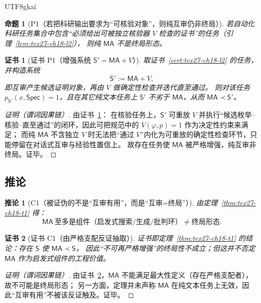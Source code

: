 \documentclass[12pt]{article}
\newtheorem{proposition}{命题}[section]
\newtheorem{corollary}{推论}[section]
\newtheorem{Certificate}{证书}[section]
\begin{document}
\begin{CJK*}{UTF8}{gkai}
\begin{proposition}[P1（若把科研输出要求为“可核验对象”，则纯互审仍非终局）]
\label{prop:tex27-ch18-p1}
若自动化科研任务集合中包含“必须给出可被独立核验器 $V$ 检查的证书”的任务（引理~\ref{lem:tex27-ch18-l2}），
则纯 $\mathsf{MA}$ 不是终局形态。
\end{proposition}

\begin{Certificate}[证书 P1（增强系统 $\mathsf{S}'=\mathsf{MA}+V$）]
\label{cert:tex27-ch18-p1}
取证书~\ref{cert:tex27-ch18-l2} 的任务，并构造系统
\[
  \mathsf{S}':=\mathsf{MA}+V,
\]
即互审产生候选证明对象，再由 $V$ 做确定性检查并迭代直至通过。
则对该任务 $p_{\mathsf{S}'}(x,\mathsf{Spec})=1$，且在其它纯文本任务上 $\mathsf{S}'$ 不劣于 $\mathsf{MA}$，从而 $\mathsf{MA}\prec \mathsf{S}'$。
\end{Certificate}

\begin{proof}[证明（谓词因果链）]
由证书~\ref{cert:tex27-ch18-p1}：
在核验任务上，$\mathsf{S}'$ 可重放 $V$ 并执行“候选枚举--核验--直至通过”的闭环，因此可把规范中的 $V(\varphi,p)=1$ 作为决定性约束来满足；
而纯 $\mathsf{MA}$ 不含独立 $V$ 时无法把“通过 $V$”内化为可重放的确定性检查环节，只能停留在对话式互审与经验性置信上。
故存在任务使 $\mathsf{MA}$ 被严格增强，纯互审非终局。证毕。
\end{proof}

\subsection{推论}
\label{subsec:tex27-ch18-corollaries}

\begin{corollary}[C1（被证伪的不是“互审有用”，而是“互审=终局”）]
\label{cor:tex27-ch18-c1}
由定理~\ref{thm:tex27-ch18-t1} 得：
\[
  \mathsf{MA}\ \text{至多是组件（启发式搜索/生成/批判环）}\neq\text{终局形态}.
\]
\end{corollary}

\begin{Certificate}[证书 C1（由严格支配反证抽取）]
\label{cert:tex27-ch18-c1}
证书即定理~\ref{thm:tex27-ch18-t1} 的结论：存在 $\mathsf{S}$ 使 $\mathsf{MA}\prec \mathsf{S}$，
因此“不可再严格增强”的终局性不成立；但这并不否定 $\mathsf{MA}$ 作为启发式组件的工程价值。
\end{Certificate}

\begin{proof}[证明（谓词因果链）]
由证书~\ref{cert:tex27-ch18-c1}，$\mathsf{MA}$ 不能满足最大性定义（存在严格支配者），故不可能是终局形态；
另一方面，定理并未声称 $\mathsf{MA}$ 在纯文本任务上无效，因此“互审有用”不被该反证触及。证毕。
\end{proof}


\end{CJK*}
\end{document}
